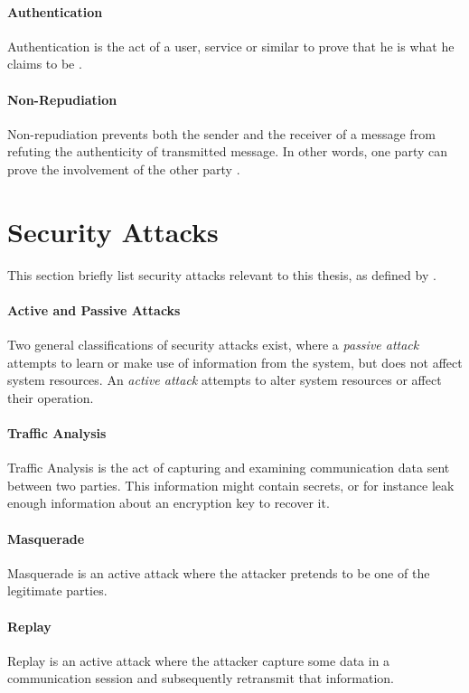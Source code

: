 \documentclass[pdftex,english,10pt,b5paper,twoside]{book}
\begin{document}
\paragraph{Authentication} Authentication is the act of a user, service or
similar to prove that he is what he claims to be \cite{stallings}.

\paragraph{Non-Repudiation} Non-repudiation prevents both the sender and the
receiver of a message from refuting the authenticity of transmitted message. In
other words, one party can prove the involvement of the other party
\cite{stallings}.

\section{Security Attacks}

This section briefly list security attacks relevant to this thesis, as defined
by \citet[Ch. 1.3]{stallings}.

\paragraph{Active and Passive Attacks} Two general classifications of security
attacks exist, where a \emph{passive attack} attempts to learn or make use of
information from the system, but does not affect system resources. An
\emph{active attack} attempts to alter system resources or affect their
operation.

\paragraph{Traffic Analysis} Traffic Analysis is the act of capturing and
examining communication data sent between two parties. This information might
contain secrets, or for instance leak enough information about an encryption key
to recover it.

\paragraph{Masquerade} Masquerade is an active attack where the attacker pretends to be
one of the legitimate parties.

\paragraph{Replay} Replay is an active attack where the attacker capture some
data in a communication session and subsequently retransmit that information.
\end{document}
